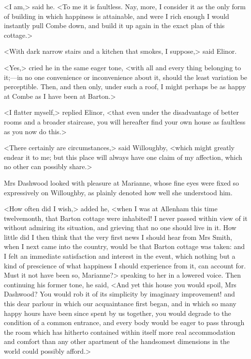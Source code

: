 <I am,> said he. <To me it is faultless. Nay, more, I consider it as the only form of building in which happiness is attainable, and were I rich enough I would instantly pull Combe down, and build it up again in the exact plan of this cottage.>

<With dark narrow stairs and a kitchen that smokes, I suppose,> said Elinor.

<Yes,> cried he in the same eager tone, <with all and every thing belonging to it;—in no one convenience or inconvenience about it, should the least variation be perceptible. Then, and then only, under such a roof, I might perhaps be as happy at Combe as I have been at Barton.>

<I flatter myself,> replied Elinor, <that even under the disadvantage of better rooms and a broader staircase, you will hereafter find your own house as faultless as you now do this.>

<There certainly are circumstances,> said Willoughby, <which might greatly endear it to me; but this place will always have one claim of my affection, which no other can possibly share.>

Mrs Dashwood looked with pleasure at Marianne, whose fine eyes were fixed so expressively on Willoughby, as plainly denoted how well she understood him.

<How often did I wish,> added he, <when I was at Allenham this time twelvemonth, that Barton cottage were inhabited! I never passed within view of it without admiring its situation, and grieving that no one should live in it. How little did I then think that the very first news I should hear from Mrs Smith, when I next came into the country, would be that Barton cottage was taken: and I felt an immediate satisfaction and interest in the event, which nothing but a kind of prescience of what happiness I should experience from it, can account for. Must it not have been so, Marianne?> speaking to her in a lowered voice. Then continuing his former tone, he said, <And yet this house you would spoil, Mrs Dashwood? You would rob it of its simplicity by imaginary improvement! and this dear parlour in which our acquaintance first began, and in which so many happy hours have been since spent by us together, you would degrade to the condition of a common entrance, and every body would be eager to pass through the room which has hitherto contained within itself more real accommodation and comfort than any other apartment of the handsomest dimensions in the world could possibly afford.>

